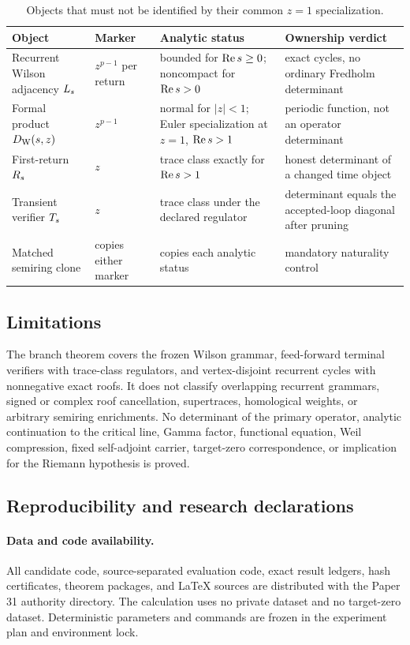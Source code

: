 \begin{table}[H]
\centering
\caption{Objects that must not be identified by their common $z=1$
specialization.}
\label{tab:ownership}
\small
\begin{tabularx}{\textwidth}{@{}L{31mm}L{29mm}Y Y@{}}
\toprule
Object & Marker & Analytic status & Ownership verdict \\
\midrule
Recurrent Wilson adjacency $L_s$ & $z^{p-1}$ per return & bounded for $\operatorname{Re} s\geq0$; noncompact for $\operatorname{Re} s>0$ & exact cycles, no ordinary Fredholm determinant \\
Formal product $D_{\mathrm W}(s,z)$ & $z^{p-1}$ & normal for $|z|<1$; Euler specialization at $z=1$, $\operatorname{Re} s>1$ & periodic function, not an operator determinant \\
First-return $R_s$ & $z$ & trace class exactly for $\operatorname{Re} s>1$ & honest determinant of a changed time object \\
Transient verifier $T_s$ & $z$ & trace class under the declared regulator & determinant equals the accepted-loop diagonal after pruning \\
Matched semiring clone & copies either marker & copies each analytic status & mandatory naturality control \\
\bottomrule
\end{tabularx}
\end{table}

\subsection{Limitations}

The branch theorem covers the frozen Wilson grammar, feed-forward terminal
verifiers with trace-class regulators, and vertex-disjoint recurrent cycles
with nonnegative exact roofs.  It does not classify overlapping recurrent
grammars, signed or complex roof cancellation, supertraces, homological
weights, or arbitrary semiring enrichments.  No determinant of the primary
operator, analytic continuation to the critical line, Gamma factor,
functional equation, Weil compression, fixed self-adjoint carrier, target-zero
correspondence, or implication for the Riemann hypothesis is proved.

\subsection{Reproducibility and research declarations}

\paragraph{Data and code availability.}
All candidate code, source-separated evaluation code, exact result ledgers,
hash certificates, theorem packages, and LaTeX sources are distributed with
the Paper 31 authority directory.  The calculation uses no private dataset
and no target-zero dataset.  Deterministic parameters and commands are frozen
in the experiment plan and environment lock.

